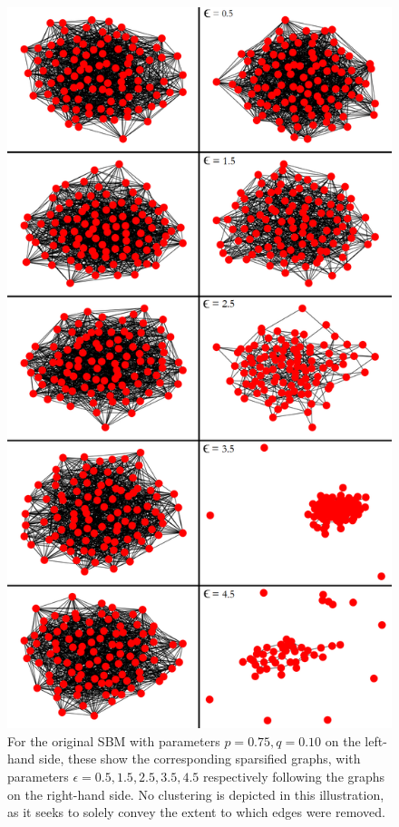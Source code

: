 \documentclass{article}
\begin{document}
\begin{figure}[H]
    \centering
    \includegraphics[width=.75\textwidth]{results/results_original_vs_sparse.png}
    \caption[Sparsified graphs across $\epsilon$]{For the original SBM with parameters $p=0.75,q=0.10$ on the left-hand side, these show the corresponding sparsified graphs, with parameters $\epsilon=0.5,1.5,2.5,3.5,4.5$ respectively following the graphs on the right-hand side. No clustering is depicted in this illustration, as it seeks to solely convey the extent to which edges were removed.}
    \label{fig:results_original_vs_sparse}
\end{figure}
\end{document}
